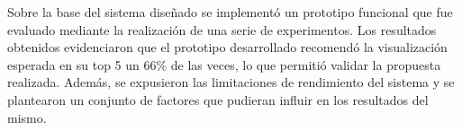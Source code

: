 \begin{conclusions}
    Sobre la base del sistema dise\~nado se implement\'o un prototipo funcional que fue evaluado mediante la realizaci\'on
    de una serie de experimentos. Los resultados obtenidos evidenciaron que el prototipo desarrollado recomend\'o
    la visualizaci\'on esperada en su top 5 un 66\% de las veces, lo que permiti\'o validar la propuesta realizada. 
    Adem\'as, se expusieron las limitaciones de rendimiento del sistema y se plantearon un conjunto de factores que pudieran influir en los resultados
    del mismo.



\end{conclusions}
